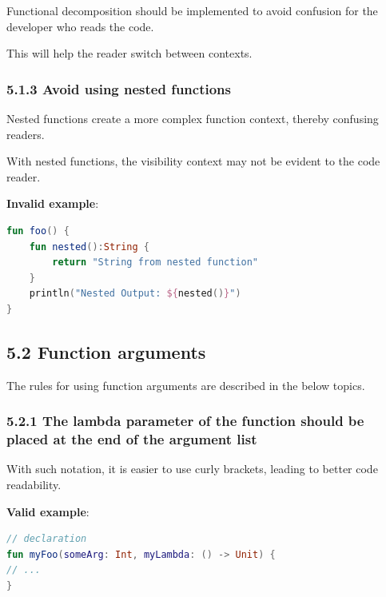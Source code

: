 {{{{Functional decomposition should be implemented to avoid confusion for the developer who reads the code.

This will help the reader switch between contexts.



\subsubsection*{\textbf{5.1.3 Avoid using nested functions}}
\leavevmode\newline

\label{sec:5.1.3}

Nested functions create a more complex function context, thereby confusing readers.

With nested functions, the visibility context may not be evident to the code reader.



\textbf{Invalid example}:

\begin{lstlisting}[language=Kotlin]
fun foo() { 
    fun nested():String { 
        return "String from nested function" 
    } 
    println("Nested Output: ${nested()}") 
} 
\end{lstlisting}


\subsection*{\textbf{5.2 Function arguments}}

\label{sec:5.2}

The rules for using function arguments are described in the below topics.

\subsubsection*{\textbf{5.2.1 The lambda parameter of the function should be placed at the end of the argument list}}
\leavevmode\newline

\label{sec:5.2.1}



With such notation, it is easier to use curly brackets, leading to better code readability.



\textbf{Valid example}:

\begin{lstlisting}[language=Kotlin]
// declaration
fun myFoo(someArg: Int, myLambda: () -> Unit) {
// ...
}


\end{lstlisting}}}}}
